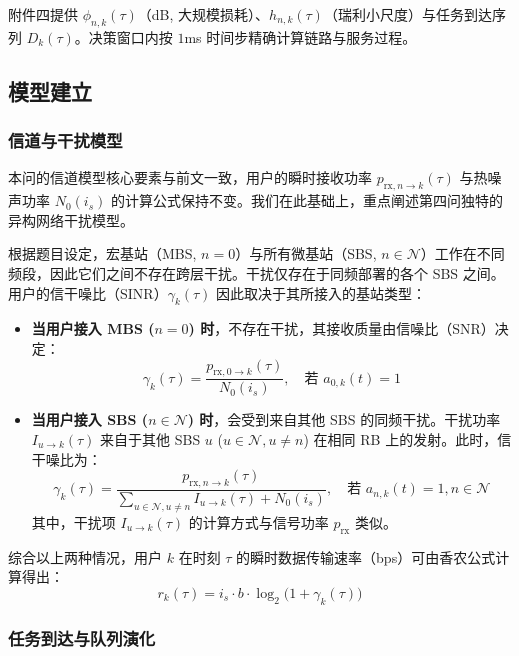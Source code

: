 附件四提供 $\phi_{n,k}(\tau)$（dB, 大规模损耗）、$h_{n,k}(\tau)$（瑞利小尺度）与任务到达序列 $D_k(\tau)$。决策窗口内按 $1$ms 时间步精确计算链路与服务过程。

\subsection{模型建立}

\subsubsection{信道与干扰模型}

本问的信道模型核心要素与前文一致，用户的瞬时接收功率 $p_{\mathrm{rx},n\to k}(\tau)$ 与热噪声功率 $N_0(i_s)$ 的计算公式保持不变。我们在此基础上，重点阐述第四问独特的异构网络干扰模型。

根据题目设定，宏基站（MBS, $n=0$）与所有微基站（SBS, $n \in \mathcal{N}$）工作在不同频段，因此它们之间不存在跨层干扰。干扰仅存在于同频部署的各个 SBS 之间。用户的信干噪比（SINR）$\gamma_k(\tau)$ 因此取决于其所接入的基站类型：
\begin{itemize}
    \item \textbf{当用户接入 MBS ($n=0$) 时}，不存在干扰，其接收质量由信噪比（SNR）决定：
    \begin{equation}
        \gamma_k(\tau) = \frac{p_{\mathrm{rx},0\to k}(\tau)}{N_0(i_s)}, \quad \text{若 } a_{0,k}(t)=1
    \end{equation}

    \item \textbf{当用户接入 SBS ($n \in \mathcal{N}$) 时}，会受到来自其他 SBS 的同频干扰。干扰功率 $I_{u\to k}(\tau)$ 来自于其他 SBS $u$ ($u \in \mathcal{N}, u \neq n$) 在相同 RB 上的发射。此时，信干噪比为：
    \begin{equation}
        \gamma_k(\tau) = \frac{p_{\mathrm{rx},n\to k}(\tau)}{\sum_{u \in \mathcal{N}, u \neq n} I_{u\to k}(\tau) + N_0(i_s)}, \quad \text{若 } a_{n,k}(t)=1, n \in \mathcal{N}
    \end{equation}
    其中，干扰项 $I_{u\to k}(\tau)$ 的计算方式与信号功率 $p_{\mathrm{rx}}$ 类似。
\end{itemize}

综合以上两种情况，用户 $k$ 在时刻 $\tau$ 的瞬时数据传输速率（bps）可由香农公式计算得出：
\begin{equation}
 r_k(\tau)=i_s\cdot b\cdot \log_2\big(1+\gamma_k(\tau)\big)
\end{equation}

\subsubsection{任务到达与队列演化}

